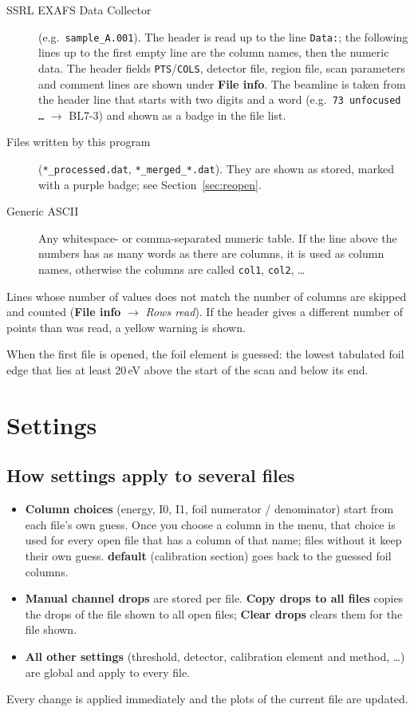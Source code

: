 \documentclass[11pt,a4paper]{article}
\newcommand{\ui}[1]{\textsf{\textbf{#1}}}          %
\newcommand{\file}[1]{\texttt{#1}}
\newcommand{\col}[1]{\texttt{#1}}                  %
\begin{document}
\begin{description}
  \item[SSRL EXAFS Data Collector] (e.g.\ \file{sample\_A.001}). The header is read up to the
        line \texttt{Data:}; the following lines up to the first empty line are the column names, then
        the numeric data. The header fields \texttt{PTS}/\texttt{COLS}, detector file, region file,
        scan parameters and comment lines are shown under \ui{File info}. The beamline is taken from the
        header line that starts with two digits and a word (e.g.\ \texttt{73 unfocused \ldots} $\to$ BL7-3)
        and shown as a badge in the file list.
  \item[Files written by this program] (\file{*\_processed.dat}, \file{*\_merged\_*.dat}). They are
        shown as stored, marked with a purple badge; see Section~\ref{sec:reopen}.
  \item[Generic ASCII] Any whitespace- or comma-separated numeric table. If the line above the
        numbers has as many words as there are columns, it is used as column names, otherwise the columns
        are called \col{col1}, \col{col2}, \ldots
\end{description}
Lines whose number of values does not match the number of columns are skipped and
counted (\ui{File info} $\to$ \emph{Rows read}). If the header gives a different
number of points than was read, a yellow warning is shown.

When the first file is opened, the foil element is guessed: the lowest tabulated
foil edge that lies at least 20\,eV above the start of the scan and below its end.

\section{Settings}

\subsection{How settings apply to several files}
\begin{itemize}
  \item \textbf{Column choices} (energy, I0, I1, foil numerator / denominator) start from each file's own
        guess. Once you choose a column in the menu, that choice is used for every open file that has a
        column of that name; files without it keep their own guess. \ui{default} (calibration section)
        goes back to the guessed foil columns.
  \item \textbf{Manual channel drops} are stored per file. \ui{Copy drops to all files} copies the drops
        of the file shown to all open files; \ui{Clear drops} clears them for the file shown.
  \item \textbf{All other settings} (threshold, detector, calibration element and method, \ldots) are
        global and apply to every file.
\end{itemize}
Every change is applied immediately and the plots of the current file are updated.
\end{document}
